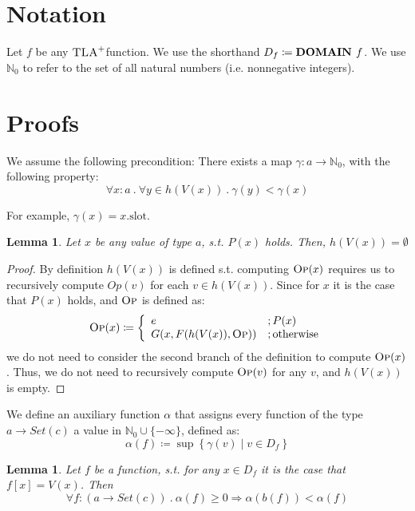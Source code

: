 \documentclass{article}
\newtheorem{lemma}[theorem]{Lemma}
\newcommand{\iteDef}[4]{
  #1 \coloneqq \left\{
\begin{array}{ll}
      #2 &; #3 \\
      #4 &; \text{otherwise}\\
\end{array} 
\right. 
}
\newcommand{\tlap}{$\textsc{TLA}^{+}$}
\newcommand{\nat}{\mathbb N_0}
\newcommand{\op}{\textsc{Op}}
\begin{document}
\section{Notation}
Let $f$ be any \tlap function. We use the shorthand $D_f \coloneqq \text{\bf DOMAIN } f$.
We use $\nat$ to refer to the set of all natural numbers (i.e. nonnegative integers).

\section{Proofs}

We assume the following precondition: There exists a map $\gamma: a \to \nat$, with the following property:
\[
\forall x\colon a \ .\ \forall y \in h(V(x)) \ .\ \gamma(y) < \gamma(x) 
\]

For example, $\gamma(x) = x.\text{slot}$.


\begin{lemma}\label{lemma1}
Let $x$ be any value of type $a$, s.t. $P(x)$ holds. Then, $h(V(x)) = \emptyset$
\end{lemma}

\begin{proof}
By definition $h(V(x))$ is defined s.t. computing $\op(x)$ requires us to recursively compute $Op(v)$ for each $v \in h(V(x))$. Since for $x$ it is the case that $P(x)$ holds, and $\op$ is defined as:
\[
\iteDef{\op(x)}{e}{P(x)}{G(x, F(h(V(x)), \op))}
\]
we do not need to consider the second branch of the definition to compute $\op(x)$. Thus, we do not need to recursively compute $\op(v)$ for any $v$, and $h(V(x))$ is empty.
\end{proof}

We define an auxiliary function $\alpha$ that assigns every function of the type $a \to Set(c)$ a value in $\nat \cup \{-\infty\}$, defined as:
\[
\alpha(f) \coloneqq \sup\left\{ \gamma(v) \mid v \in D_f \right\}
\]

\begin{lemma}\label{lemma2}
Let $f$ be a function, s.t. for any $x \in D_f$ it is the case that $f[x] = V(x)$. Then
\[
\forall f\colon (a \to Set(c)) \ .\ \alpha(f) \ge 0 \Rightarrow \alpha(b(f)) < \alpha(f)
\]
\end{lemma}
\end{document}
